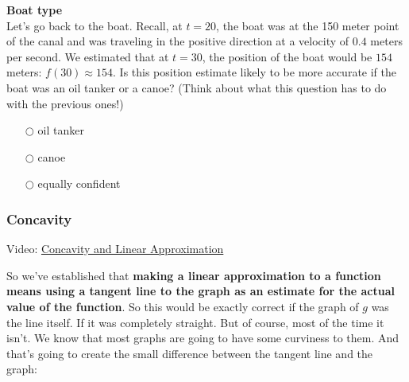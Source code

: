 \documentclass[pdftex, brazil, 12pt, twoside]{article}
\begin{document}
\begin{exercise}
  \textbf{Boat type}\\%
  Let's go back to the boat. Recall, at $t=20$, the boat was at the 150 meter point
  of the canal and was traveling in the positive direction at a velocity of $0.4$
  meters per second. We estimated that at $t=30$, the position of the boat would be
  $154$ meters: $f(30) \approx 154$. Is this position estimate likely to be more
  accurate if the boat was an oil tanker or a canoe? (Think about what this question
  has to do with the previous ones!)
  \begin{itemize}[noitemsep]
  \item[$\bigcirc$] oil tanker
  \item[$\bigcirc$] canoe
  \item[$\bigcirc$] equally confident
  \end{itemize}
\end{exercise}

\subsubsection{Concavity}
\label{u2-linear-concavity}

Video: \href{https://www.youtube.com/watch?v=IVwkNdwbFy4}{Concavity and Linear Approximation}

So we've established that \textbf{making a linear approximation
to a function means using a tangent line
to the graph as an estimate for the actual value
of the function}.
So this would be exactly correct if the graph of $g$
was the line itself.
If it was completely straight.
But of course, most of the time it isn't.
We know that most graphs are going
to have some curviness to them.
And that's going to create the small difference
between the tangent line and the graph:

\begin{figure}[H]
  \begin{center}
  \end{center}
\end{figure}
\end{document}
